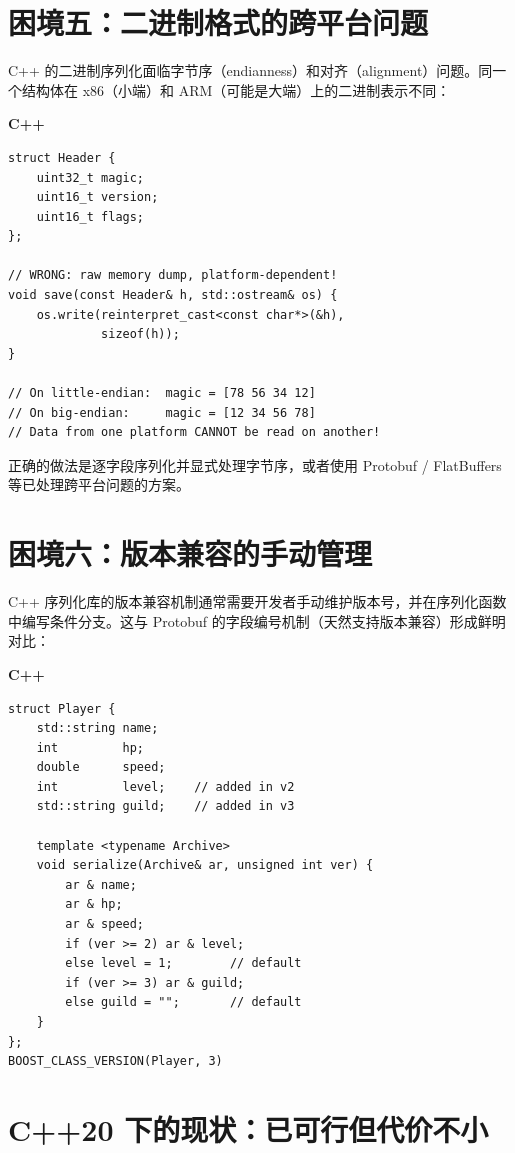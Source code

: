 \documentclass[12pt,a4paper,fontset=fandol]{ctexbook}
\newcommand{\cpplabel}{%
  \noindent\begin{tcolorbox}[colback=algheadbg,coltext=white,
    sharp corners,boxrule=0pt,width=3.0em,height=1.4em,
    halign=center,valign=center,nobeforeafter,left=0pt,right=0pt,
    top=0pt,bottom=0pt]\small\bfseries C++\end{tcolorbox}}
\begin{document}
\section{困境五：二进制格式的跨平台问题}\label{sec:endian}

C++ 的二进制序列化面临字节序（endianness）和对齐（alignment）问题。同一个结构体在 x86（小端）和 ARM（可能是大端）上的二进制表示不同：

\cpplabel
\begin{lstlisting}[caption={C++26 前: 二进制序列化的字节序陷阱}]
struct Header {
    uint32_t magic;
    uint16_t version;
    uint16_t flags;
};

// WRONG: raw memory dump, platform-dependent!
void save(const Header& h, std::ostream& os) {
    os.write(reinterpret_cast<const char*>(&h),
             sizeof(h));
}

// On little-endian:  magic = [78 56 34 12]
// On big-endian:     magic = [12 34 56 78]
// Data from one platform CANNOT be read on another!
\end{lstlisting}

正确的做法是逐字段序列化并显式处理字节序，或者使用 Protobuf / FlatBuffers 等已处理跨平台问题的方案。

\section{困境六：版本兼容的手动管理}\label{sec:version-manual}

C++ 序列化库的版本兼容机制通常需要开发者手动维护版本号，并在序列化函数中编写条件分支。这与 Protobuf 的字段编号机制（天然支持版本兼容）形成鲜明对比：

\cpplabel
\begin{lstlisting}[caption={C++26 前: 版本兼容需要手动维护}]
struct Player {
    std::string name;
    int         hp;
    double      speed;
    int         level;    // added in v2
    std::string guild;    // added in v3

    template <typename Archive>
    void serialize(Archive& ar, unsigned int ver) {
        ar & name;
        ar & hp;
        ar & speed;
        if (ver >= 2) ar & level;
        else level = 1;        // default
        if (ver >= 3) ar & guild;
        else guild = "";       // default
    }
};
BOOST_CLASS_VERSION(Player, 3)
\end{lstlisting}

\section{C++20 下的现状：已可行但代价不小}\label{sec:cpp20-status}
\end{document}
